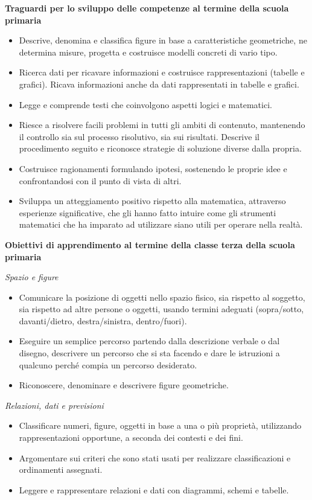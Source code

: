\documentclass[12pt]{report}
\begin{document}
\bigskip
\textbf{Traguardi per lo sviluppo delle competenze al termine della scuola primaria}
\begin{itemize}
	\item Descrive, denomina e classifica figure in base a caratteristiche geometriche, ne determina misure, progetta e costruisce modelli concreti di vario tipo.
	\item Ricerca dati per ricavare informazioni e costruisce rappresentazioni (tabelle e grafici). Ricava informazioni anche da dati rappresentati in tabelle e grafici.
	\item Legge e comprende testi che coinvolgono aspetti logici e matematici.
	\item Riesce a risolvere facili problemi in tutti gli ambiti di contenuto, mantenendo il controllo sia sul processo risolutivo, sia sui risultati. Descrive il procedimento seguito e riconosce strategie di soluzione diverse dalla propria.
	\item Costruisce ragionamenti formulando ipotesi, sostenendo le proprie idee e confrontandosi con il punto di vista di altri.
	\item Sviluppa un atteggiamento positivo rispetto alla matematica, attraverso esperienze significative, che gli hanno fatto intuire come gli strumenti matematici che ha imparato ad utilizzare siano utili per operare nella realtà.
\end{itemize}

\medskip
\noindent \textbf{Obiettivi di apprendimento al termine della classe terza della scuola primaria}
\begin{description}
	\item \textit{Spazio e figure}
		\begin{itemize}
			\item Comunicare la posizione di oggetti nello spazio fisico, sia rispetto al soggetto, sia rispetto ad altre persone o oggetti, usando termini adeguati (sopra/sotto, davanti/dietro, destra/sinistra, dentro/fuori).
			\item Eseguire un semplice percorso partendo dalla descrizione verbale o dal disegno, descrivere un percorso che si sta facendo e dare le istruzioni a qualcuno perché compia un percorso desiderato.
			\item Riconoscere, denominare e descrivere figure geometriche.
		\end{itemize}
\medskip
	\item \textit{Relazioni, dati e previsioni}
		\begin{itemize}
			\item Classificare numeri, figure, oggetti in base a una o più proprietà, utilizzando rappresentazioni opportune, a seconda dei contesti e dei fini.
			\item Argomentare sui criteri che sono stati usati per realizzare classificazioni e ordinamenti assegnati.
			\item Leggere e rappresentare relazioni e dati con diagrammi, schemi e tabelle.
		\end{itemize}
\end{description}
\end{document}
